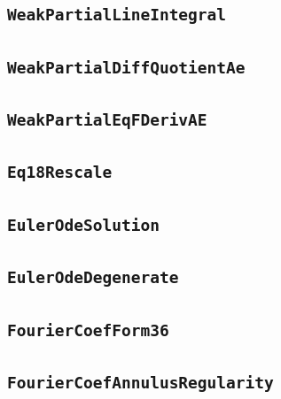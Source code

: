 \documentclass[11pt]{amsart}
\theoremstyle{definition}
\begin{document}
\subsection{\texorpdfstring{\texttt{WeakPartialLineIntegral}}{WeakPartialLineIntegral}}\label{node:WeakPartialLineIntegral}


\subsection{\texorpdfstring{\texttt{WeakPartialDiffQuotientAe}}{WeakPartialDiffQuotientAe}}\label{node:WeakPartialDiffQuotientAe}


\subsection{\texorpdfstring{\texttt{WeakPartialEqFDerivAE}}{WeakPartialEqFDerivAE}}\label{node:WeakPartialEqFDerivAE}


\subsection{\texorpdfstring{\texttt{Eq18Rescale}}{Eq18Rescale}}\label{node:Eq18Rescale}


\subsection{\texorpdfstring{\texttt{EulerOdeSolution}}{EulerOdeSolution}}\label{node:EulerOdeSolution}


\subsection{\texorpdfstring{\texttt{EulerOdeDegenerate}}{EulerOdeDegenerate}}\label{node:EulerOdeDegenerate}


\subsection{\texorpdfstring{\texttt{FourierCoefForm36}}{FourierCoefForm36}}\label{node:FourierCoefForm36}


\subsection{\texorpdfstring{\texttt{FourierCoefAnnulusRegularity}}{FourierCoefAnnulusRegularity}}\label{node:FourierCoefAnnulusRegularity}

\end{document}
